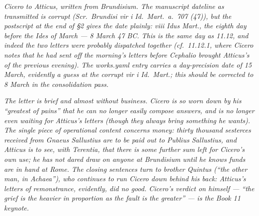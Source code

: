 
\textit{Cicero to Atticus, written from Brundisium. The
manuscript dateline as transmitted is corrupt
(\textit{Scr.\ Brundisi vir i Id.\ Mart.\ a.\ 707 (47)}),
but the postscript at the end of \S2 gives the date
plainly: \textit{viii Idus Mart.}, the eighth day before
the Ides of March --- 8 March 47 BC. This is the same
day as 11.12, and indeed the two letters were probably
dispatched together (cf.\ 11.12.1, where Cicero notes
that he had sent off the morning's letters before
Cephalio brought Atticus's of the previous evening).
The works.yaml entry carries a day-precision date of
15 March, evidently a guess at the corrupt
\textit{vir i Id.\ Mart.}; this should be corrected to
8 March in the consolidation pass.}

\textit{The letter is brief and almost without business.
Cicero is so worn down by his ``greatest of pains'' that
he can no longer easily compose answers, and is no
longer even waiting for Atticus's letters (though they
always bring something he wants). The single piece of
operational content concerns money: thirty thousand
sesterces received from Gnaeus Sallustius are to be paid
out to Publius Sallustius, and Atticus is to see, with
Terentia, that there is some further sum left for
Cicero's own use; he has not dared draw on anyone at
Brundisium until he knows funds are in hand at Rome.
The closing sentences turn to brother Quintus
(``the other man, in Achaea''), who continues to run
Cicero down behind his back: Atticus's letters of
remonstrance, evidently, did no good. Cicero's verdict
on himself --- ``the grief is the heavier in proportion
as the fault is the greater'' --- is the Book 11
keynote.}
